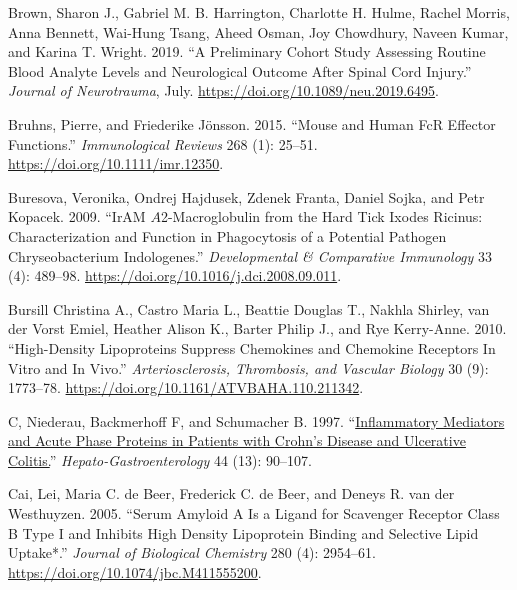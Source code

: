 \documentclass[9pt,lineno]{elife}
\newlength{\cslhangindent}
\newlength{\cslentryspacingunit} %
\newenvironment{CSLReferences}[2] %
 {%
  \setlength{\parindent}{0pt}
  \ifodd #1
  \let\oldpar\par
  \def\par{\hangindent=\cslhangindent\oldpar}
  \fi
  \setlength{\parskip}{#2\cslentryspacingunit}
 }%
 {}
\begin{document}
\begin{CSLReferences}{1}{0}
\leavevmode{}%
Brown, Sharon J., Gabriel M. B. Harrington, Charlotte H. Hulme, Rachel Morris, Anna Bennett, Wai-Hung Tsang, Aheed Osman, Joy Chowdhury, Naveen Kumar, and Karina T. Wright. 2019. {``A Preliminary Cohort Study Assessing Routine Blood Analyte Levels and Neurological Outcome After Spinal Cord Injury.''} \emph{Journal of Neurotrauma}, July. \url{https://doi.org/10.1089/neu.2019.6495}.

\leavevmode{}%
Bruhns, Pierre, and Friederike Jönsson. 2015. {``Mouse and Human {FcR} Effector Functions.''} \emph{Immunological Reviews} 268 (1): 25--51. \url{https://doi.org/10.1111/imr.12350}.

\leavevmode{}%
Buresova, Veronika, Ondrej Hajdusek, Zdenek Franta, Daniel Sojka, and Petr Kopacek. 2009. {``{IrAM} {\(A\)}2-Macroglobulin from the Hard Tick {Ixodes} Ricinus: {Characterization} and Function in Phagocytosis of a Potential Pathogen {Chryseobacterium} Indologenes.''} \emph{Developmental \& Comparative Immunology} 33 (4): 489--98. \url{https://doi.org/10.1016/j.dci.2008.09.011}.

\leavevmode{}%
Bursill Christina A., Castro Maria L., Beattie Douglas T., Nakhla Shirley, van der Vorst Emiel, Heather Alison K., Barter Philip J., and Rye Kerry-Anne. 2010. {``High-{Density Lipoproteins Suppress Chemokines} and {Chemokine Receptors In Vitro} and {In Vivo}.''} \emph{Arteriosclerosis, Thrombosis, and Vascular Biology} 30 (9): 1773--78. \url{https://doi.org/10.1161/ATVBAHA.110.211342}.

\leavevmode{}%
C, Niederau, Backmerhoff F, and Schumacher B. 1997. {``\href{https://www.ncbi.nlm.nih.gov/pubmed/9058126}{Inflammatory Mediators and Acute Phase Proteins in Patients with {Crohn}'s Disease and Ulcerative Colitis.}''} \emph{Hepato-Gastroenterology} 44 (13): 90--107.

\leavevmode{}%
Cai, Lei, Maria C. de Beer, Frederick C. de Beer, and Deneys R. van der Westhuyzen. 2005. {``Serum {Amyloid A Is} a {Ligand} for {Scavenger Receptor Class B Type I} and {Inhibits High Density Lipoprotein Binding} and {Selective Lipid Uptake}*.''} \emph{Journal of Biological Chemistry} 280 (4): 2954--61. \url{https://doi.org/10.1074/jbc.M411555200}.


\end{CSLReferences}
\end{document}
